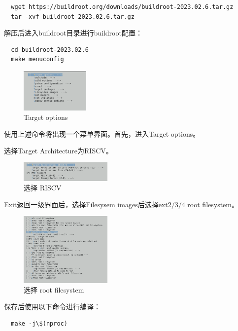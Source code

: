 \documentclass[lang=cn,10pt]{elegantbook}
\begin{document}
\begin{lstlisting}
  wget https://buildroot.org/downloads/buildroot-2023.02.6.tar.gz
  tar -xvf buildroot-2023.02.6.tar.gz
\end{lstlisting}

解压后进入buildroot目录进行buildroot配置：

\begin{lstlisting}
  cd buildroot-2023.02.6
  make menuconfig
\end{lstlisting}

\begin{figure}[htbp]
  \centering
  \includegraphics[width=0.3\textwidth]{image/image-20231105101258501.png}
  \caption{Target options}
\end{figure}
使用上述命令将出现一个菜单界面。首先，进入Target options。

\newpage

选择Target Architecture为RISCV。
\begin{figure}[htbp]
  \centering
  \includegraphics[width=0.4\textwidth]{image/image-20231105101313146.png}
  \caption{选择 RISCV}
\end{figure}

Exit返回一级界面后，选择Filesysem images后选择ext2/3/4 root filesystem。
\begin{figure}[htbp]
  \centering
  \includegraphics[width=0.4\textwidth]{image/image-20231105101339834.png}
  \caption{选择  root filesystem}
\end{figure}

保存后使用以下命令进行编译：

\begin{lstlisting}
  make -j\$(nproc)	
\end{lstlisting}
\end{document}
